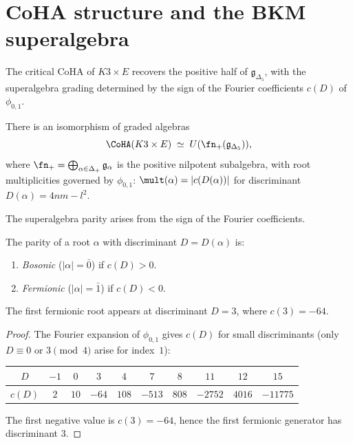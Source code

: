 \section{CoHA structure and the BKM superalgebra}
\label{sec:k3e-coha-structure}

The critical CoHA of $K3 \times E$ recovers the positive half of $\mathfrak{g}_{\Delta_5}$, with the superalgebra grading determined by the sign of the Fourier coefficients $c(D)$ of $\phi_{0,1}$.

\begin{theorem}
\label{thm:k3e-coha}
\ClaimStatusProvedElsewhere
There is an isomorphism of graded algebras
\[
 \CoHA(K3 \times E) \;\simeq\; U(\fn_+(\mathfrak{g}_{\Delta_5})),
\]
where $\fn_+ = \bigoplus_{\alpha \in \Delta_+} \mathfrak{g}_\alpha$ is the positive nilpotent subalgebra, with root multiplicities governed by $\phi_{0,1}$: $\mult(\alpha) = |c(D(\alpha))|$ for discriminant $D(\alpha) = 4nm - l^2$.
\end{theorem}

The superalgebra parity arises from the sign of the Fourier coefficients.

\begin{proposition}
\label{prop:k3e-super-grading}
The parity of a root $\alpha$ with discriminant $D = D(\alpha)$ is:
\begin{enumerate}[label=(\roman*)]
 \item \emph{Bosonic} ($|\alpha| = \bar{0}$) if $c(D) > 0$.
 \item \emph{Fermionic} ($|\alpha| = \bar{1}$) if $c(D) < 0$.
\end{enumerate}
The first fermionic root appears at discriminant $D = 3$, where $c(3) = -64$.
\ClaimStatusProvedHere
\end{proposition}

\begin{proof}
The Fourier expansion of $\phi_{0,1}$ gives $c(D)$ for small discriminants
(only $D \equiv 0$ or $3 \pmod{4}$ arise for index~$1$):
\begin{center}
\begin{tabular}{c|ccccccccc}
$D$ & $-1$ & $0$ & $3$ & $4$ & $7$ & $8$ & $11$ & $12$ & $15$ \\ \hline
$c(D)$ & $2$ & $10$ & $-64$ & $108$ & $-513$ & $808$ & $-2752$ & $4016$ & $-11775$
\end{tabular}
\end{center}
The first negative value is $c(3) = -64$, hence the first fermionic generator has discriminant $3$.
\end{proof}

